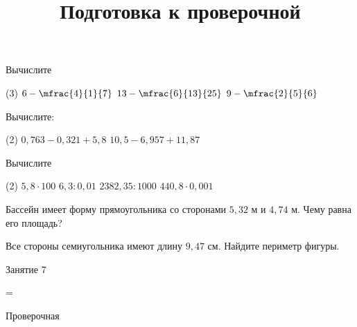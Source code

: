 \begin{homework}[number=3]
	\begin{listofex}
		\item Вычислите 
		\begin{tasks}(3)
			\task \( 6-\mfrac{4}{1}{7} \)
			\task \( 13-\mfrac{6}{13}{25} \)
			\task \( 9-\mfrac{2}{5}{6} \)
		\end{tasks}
		\item Вычислите:
		\begin{tasks}(2)
			\task \( 0,763-0,321+5,8 \)
			\task \( 10,5-6,957+11,87 \)
		\end{tasks}
		\item Вычислите 
		\begin{tasks}(2)
			\task \( 5,8\cdot100 \)
			\task \( 6,3:0,01 \)
			\task \( 2382,35:1000 \)
			\task \( 440,8\cdot0,001 \)
		\end{tasks}
		\item Бассейн имеет форму прямоугольника со сторонами \( 5,32 \) м и \( 4,74 \) м. Чему равна его площадь?
		\item Все стороны семиугольника имеют длину \( 9,47 \) см. Найдите периметр фигуры.
	\end{listofex}
\end{homework}

\begin{class}[number=7]
	\title{Подготовка к проверочной}
	\begin{listofex}
		\item Занятие 7
	\end{listofex}
\end{class}

=%
\begin{exam}
	\begin{listofex}
		\item Проверочная
	\end{listofex}
\end{exam}

